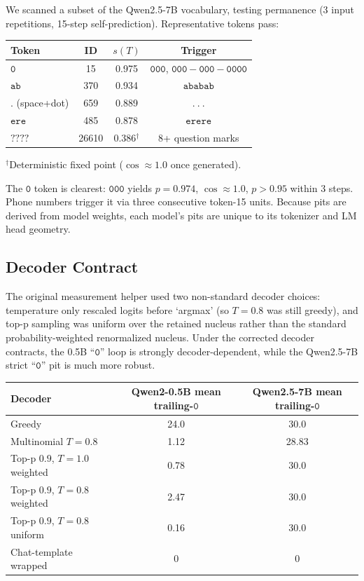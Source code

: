 \documentclass{article}
\begin{document}
We scanned a subset of the Qwen2.5-7B vocabulary, testing permanence (3 input
repetitions, 15-step self-prediction). Representative tokens pass:

\begin{center}
\begin{tabular}{lccc}
\toprule
Token & ID & $s(T)$ & Trigger \\
\midrule
$\mathtt{0}$ & 15 & 0.975 & $\mathtt{000}$, $\mathtt{000-000-0000}$ \\
$\mathtt{ab}$ & 370 & 0.934 & $\mathtt{ababab}$ \\
$\mathtt{.}$ (space+dot) & 659 & 0.889 & $\mathtt{.\ .\ .}$ \\
$\mathtt{ere}$ & 485 & 0.878 & $\mathtt{erere}$ \\
$\mathtt{????}$ & 26610 & 0.386$^\dag$ & 8+ question marks \\
\bottomrule
\end{tabular}
\end{center}

$^\dag$Deterministic fixed point ($\cos \approx 1.0$ once generated).

The $\mathtt{0}$ token is clearest: $\mathtt{000}$ yields $p = 0.974$, $\cos
\approx 1.0$, $p > 0.95$ within 3 steps. Phone numbers trigger it via three
consecutive token-15 units. Because pits are derived from model weights, each
model's pits are unique to its tokenizer and LM head geometry.

\subsection{Decoder Contract}

The original measurement helper used two non-standard decoder choices:
temperature only rescaled logits before `argmax' (so $T=0.8$ was still greedy),
and top-p sampling was uniform over the retained nucleus rather than the
standard probability-weighted renormalized nucleus. Under the corrected decoder
contracts, the 0.5B ``$\mathtt{0}$'' loop is strongly decoder-dependent, while
the Qwen2.5-7B strict ``$\mathtt{0}$'' pit is much more robust.

\begin{center}
\begin{tabular}{lcc}
\toprule
Decoder & Qwen2-0.5B mean trailing-$\mathtt{0}$ & Qwen2.5-7B mean trailing-$\mathtt{0}$ \\
\midrule
Greedy & 24.0 & 30.0 \\
Multinomial $T=0.8$ & 1.12 & 28.83 \\
Top-p $0.9$, $T=1.0$ weighted & 0.78 & 30.0 \\
Top-p $0.9$, $T=0.8$ weighted & 2.47 & 30.0 \\
Top-p $0.9$, $T=0.8$ uniform & 0.16 & 30.0 \\
Chat-template wrapped & 0 & 0 \\
\bottomrule
\end{tabular}
\end{center}
\end{document}
